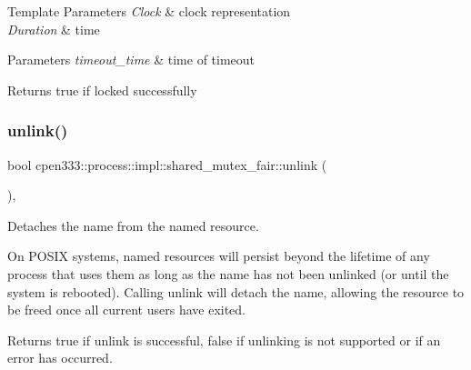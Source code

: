 \begin{DoxyTemplParams}{Template Parameters}
{\em Clock} & clock representation \\
\hline
{\em Duration} & time \\
\hline
\end{DoxyTemplParams}

\begin{DoxyParams}{Parameters}
{\em timeout\+\_\+time} & time of timeout \\
\hline
\end{DoxyParams}
\begin{DoxyReturn}{Returns}
true if locked successfully 
\end{DoxyReturn}
\mbox{\label{classcpen333_1_1process_1_1impl_1_1shared__mutex__fair_a40e20137e0c27f4a742ab6c5388eb61b}} 
\subsubsection{\texorpdfstring{unlink()}{unlink()}\hspace{0.1cm}{\footnotesize\ttfamily [1/2]}}
{\footnotesize\ttfamily bool cpen333\+::process\+::impl\+::shared\+\_\+mutex\+\_\+fair\+::unlink (\begin{DoxyParamCaption}{ }\end{DoxyParamCaption})\hspace{0.3cm}{\ttfamily [inline]}, {\ttfamily [virtual]}}



Detaches the name from the named resource. 

On P\+O\+S\+IX systems, named resources will persist beyond the lifetime of any process that uses them as long as the name has not been unlinked (or until the system is rebooted). Calling {\ttfamily unlink} will detach the name, allowing the resource to be freed once all current users have exited.

\begin{DoxyReturn}{Returns}
{\ttfamily true} if unlink is successful, {\ttfamily false} if unlinking is not supported or if an error has occurred. 
\end{DoxyReturn}


